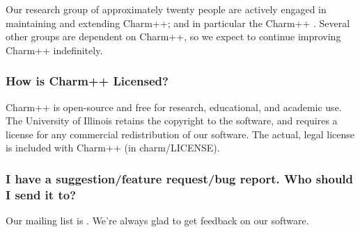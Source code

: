 Our research group of approximately twenty people are actively engaged
in maintaining and extending Charm++; and in particular the Charm++ 
.
Several other groups are dependent on Charm++, so we expect to continue
improving Charm++ indefinitely.

\subsubsection{How is Charm++ Licensed?}

Charm++ is open-source and free for research, educational, and academic
use. The University of Illinois retains the copyright to the software,
and requires a license for any commercial redistribution of our software.
The actual, legal license is included with Charm++ (in charm/LICENSE).

\subsubsection{I have a suggestion/feature request/bug report. Who should I send
it to?}

Our mailing list is .
We're always glad to get feedback on our software.
